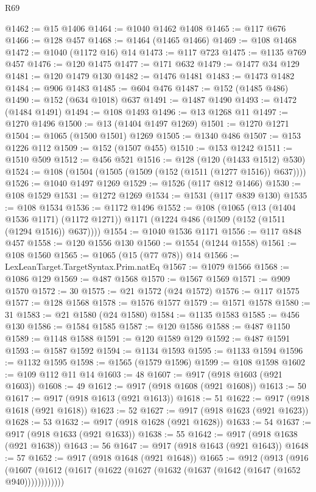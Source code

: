 \begin{lexlean}{R69}
\begin{coremodule}
@1462 := @15 @1406
@1464 := @1040 @1462 @1408
@1465 := @117 @676
@1466 := @128 @457
@1468 := @1464 (@1465 @1466)
@1469 := @108 @1468
@1472 := @1040 (@1172 @16) @14
@1473 := @117 @723
@1475 := @1135 @769 @457
@1476 := @120 @1475
@1477 := @171 @632
@1479 := @1477 @34 @129
@1481 := @120 @1479 @130
@1482 := @1476 @1481
@1483 := @1473 @1482
@1484 := @906 @1483
@1485 := @604 @476
@1487 := @152 (@1485 @486)
@1490 := @152 (@634 @1018) @637
@1491 := @1487 @1490
@1493 := @1472 (@1484 @1491)
@1494 := @108 @1493
@1496 := @13 @1268 @11
@1497 := @1270 @1496
@1500 := @13 (@1404 @1497 @1269)
@1501 := @1270 @1271
@1504 := @1065 (@1500 @1501) @1269
@1505 := @1340 @486
@1507 := @153 @1226 @112
@1509 := @152 (@1507 @455)
@1510 := @153 @1242
@1511 := @1510 @509
@1512 := @456 @521
@1516 := @128 (@120 (@1433 @1512) @530)
@1524 := @108 (@1504 (@1505 (@1509 (@152 (@1511 (@1277 @1516)) @637))))
@1526 := @1040 @1497 @1269
@1529 := @1526 (@117 @812 @1466)
@1530 := @108 @1529
@1531 := @1272 @1269
@1534 := @1531 (@117 @839 @130)
@1535 := @108 @1534
@1536 := @1172 @1496
@1552 := @108
    (@1065
      (@13 (@1404 @1536 @1171) (@1172 @1271))
      @1171
      (@1224 @486 (@1509 (@152 (@1511 (@1294 @1516)) @637))))
@1554 := @1040 @1536 @1171
@1556 := @117 @848 @457
@1558 := @120 @1556 @130
@1560 := @1554 (@1244 @1558)
@1561 := @108 @1560
@1565 := @1065 (@15 (@77 @78)) @14
@1566 := LexLeanTarget.TargetSyntax.Prim.natEq
@1567 := @1079 @1566
@1568 := @1086 @129
@1569 := @487 @1568
@1570 := @1567 @1569
@1571 := @909 @1570
@1572 := 30
@1575 := @21 @1572 (@24 @1572)
@1576 := @117 @1575
@1577 := @128 @1568
@1578 := @1576 @1577
@1579 := @1571 @1578
@1580 := 31
@1583 := @21 @1580 (@24 @1580)
@1584 := @1135 @1583
@1585 := @456 @130
@1586 := @1584 @1585
@1587 := @120 @1586
@1588 := @487 @1150
@1589 := @1148 @1588
@1591 := @120 @1589 @129
@1592 := @487 @1591
@1593 := @1587 @1592
@1594 := @1134 @1593
@1595 := @1133 @1594
@1596 := @1132 @1595
@1598 := @1565 (@1579 @1596)
@1599 := @108 @1598
@1602 := @109 @112 @11 @14
@1603 := 48
@1607 := @917 (@918 @1603 (@921 @1603))
@1608 := 49
@1612 := @917 (@918 @1608 (@921 @1608))
@1613 := 50
@1617 := @917 (@918 @1613 (@921 @1613))
@1618 := 51
@1622 := @917 (@918 @1618 (@921 @1618))
@1623 := 52
@1627 := @917 (@918 @1623 (@921 @1623))
@1628 := 53
@1632 := @917 (@918 @1628 (@921 @1628))
@1633 := 54
@1637 := @917 (@918 @1633 (@921 @1633))
@1638 := 55
@1642 := @917 (@918 @1638 (@921 @1638))
@1643 := 56
@1647 := @917 (@918 @1643 (@921 @1643))
@1648 := 57
@1652 := @917 (@918 @1648 (@921 @1648))
@1665 := @912
    (@913
      (@916 (@1607 (@1612 (@1617 (@1622 (@1627 (@1632 (@1637 (@1642 (@1647 (@1652 @940))))))))))))

\end{coremodule}
\end{lexlean}
